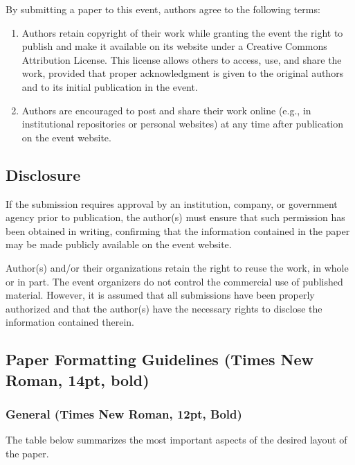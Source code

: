 \documentclass[12pt,a4paper]{article}
\begin{document}
By submitting a paper to this event, authors agree to the following
terms:

\begin{enumerate}
\def\labelenumi{\alph{enumi}.}
\item
  Authors retain copyright of their work while granting the event the
  right to publish and make it available on its website under a Creative
  Commons Attribution License. This license allows others to access,
  use, and share the work, provided that proper acknowledgment is given
  to the original authors and to its initial publication in the event.
\item
  Authors are encouraged to post and share their work online (e.g., in
  institutional repositories or personal websites) at any time after
  publication on the event website.
\end{enumerate}

\subsection{Disclosure}

If the submission requires approval by an institution, company, or
government agency prior to publication, the author(s) must ensure that
such permission has been obtained in writing, confirming that the
information contained in the paper may be made publicly available on the
event website.

Author(s) and/or their organizations retain the right to reuse the work,
in whole or in part. The event organizers do not control the commercial
use of published material. However, it is assumed that all submissions
have been properly authorized and that the author(s) have the necessary
rights to disclose the information contained therein.

\subsection{\texorpdfstring{Paper Formatting Guidelines (Times New
Roman, 14pt, bold)
}{Paper Formatting Guidelines (Times New Roman, 14pt, bold) }}

\subsubsection{General (Times New Roman, 12pt, Bold)}

The table below summarizes the most important aspects of the desired
layout of the paper.
\end{document}
